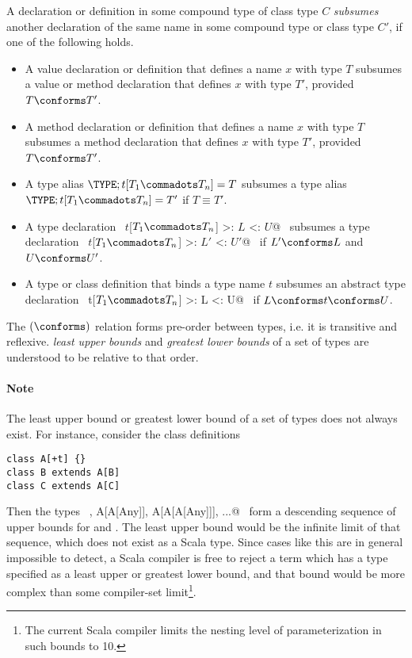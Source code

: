 A declaration or definition in some compound type of class type $C$
{\em subsumes} another
declaration of the same name in some compound type or class type $C'$, if one of the following holds.
\begin{itemize}
\item
A value declaration or definition that defines a name $x$ with type $T$ subsumes 
a value or method declaration that defines $x$ with type $T'$, provided $T \conforms T'$.
\item 
A method declaration or definition that defines a name $x$ with type $T$ subsumes 
a method declaration that defines $x$ with type $T'$, provided $T \conforms T'$.
\item
A type alias
$\TYPE;t[T_1 \commadots T_n]=T$ subsumes a type alias $\TYPE;t[T_1 \commadots T_n]=T'$ if %
$T \equiv T'$. 
\item 
A type declaration ~\lstinline@type $t$[$T_1 \commadots T_n$] >: $L$ <: $U$@~ subsumes %
a type declaration ~\lstinline@type $t$[$T_1 \commadots T_n$] >: $L'$ <: $U'$@~ if $L' \conforms L$ and %
$U \conforms U'$.
\item
A type or class definition that binds a type name $t$ subsumes an abstract
type declaration ~\lstinline@type t[$T_1 \commadots T_n$] >: L <: U@~ if %
$L \conforms t \conforms U$.
\end{itemize}

The $(\conforms)$ relation forms pre-order between types,
i.e. it is transitive and reflexive. {\em
least upper bounds} and {\em greatest lower bounds} of a set of types
are understood to be relative to that order.

\paragraph{Note} The least upper bound or greatest lower bound 
of a set of types does not always exist. For instance, consider
the class definitions
\begin{lstlisting}
class A[+t] {}
class B extends A[B] 
class C extends A[C] 
\end{lstlisting}
Then the types ~\lstinline@A[Any], A[A[Any]], A[A[A[Any]]], ...@~ form
a descending sequence of upper bounds for  and . The
least upper bound would be the infinite limit of that sequence, which
does not exist as a Scala type. Since cases like this are in general
impossible to detect, a Scala compiler is free to reject a term
which has a type specified as a least upper or greatest lower bound,
and that bound would be more complex than some compiler-set
limit\footnote{The current Scala compiler limits the nesting level
of parameterization in such bounds to 10.}.

